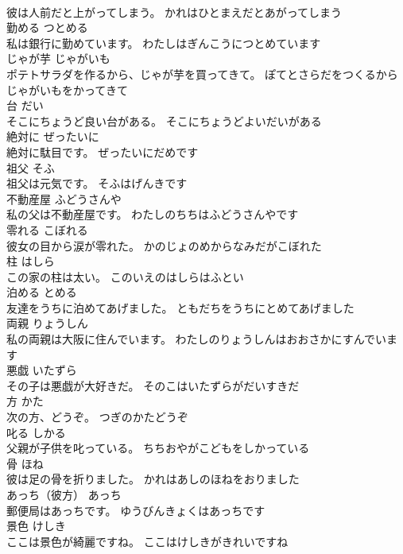 \documentclass[8pt]{extreport}
\begin{document}
\begin{CJK}{UTF8}{min}
\\	彼は人前だと上がってしまう。	かれはひとまえだとあがってしまう	
\\	勤める	つとめる	
\\	私は銀行に勤めています。	わたしはぎんこうにつとめています	
\\	じゃが芋	じゃがいも	
\\	ポテトサラダを作るから、じゃが芋を買ってきて。	ぽてとさらだをつくるからじゃがいもをかってきて	
\\	台	だい	
\\	そこにちょうど良い台がある。	そこにちょうどよいだいがある	
\\	絶対に	ぜったいに	
\\	絶対に駄目です。	ぜったいにだめです	
\\	祖父	そふ	
\\	祖父は元気です。	そふはげんきです	
\\	不動産屋	ふどうさんや	
\\	私の父は不動産屋です。	わたしのちちはふどうさんやです	
\\	零れる	こぼれる	
\\	彼女の目から涙が零れた。	かのじょのめからなみだがこぼれた	
\\	柱	はしら	
\\	この家の柱は太い。	このいえのはしらはふとい	
\\	泊める	とめる	
\\	友達をうちに泊めてあげました。	ともだちをうちにとめてあげました	
\\	両親	りょうしん	
\\	私の両親は大阪に住んでいます。	わたしのりょうしんはおおさかにすんでいます	
\\	悪戯	いたずら	
\\	その子は悪戯が大好きだ。	そのこはいたずらがだいすきだ	
\\	方	かた	
\\	次の方、どうぞ。	つぎのかたどうぞ	
\\	叱る	しかる	
\\	父親が子供を叱っている。	ちちおやがこどもをしかっている	
\\	骨	ほね	
\\	彼は足の骨を折りました。	かれはあしのほねをおりました	
\\	あっち（彼方）	あっち	
\\	郵便局はあっちです。	ゆうびんきょくはあっちです	
\\	景色	けしき	
\\	ここは景色が綺麗ですね。	ここはけしきがきれいですね	

\end{CJK}
\end{document}
